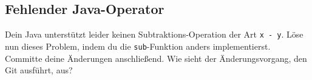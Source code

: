 \subsection{Fehlender Java-Operator}
Dein Java unterstützt leider keinen Subtraktions-Operation der Art \lstinline{x - y}. Löse nun dieses Problem, indem du die \lstinline{sub}-Funktion anders implementierst.\\
Committe deine Änderungen anschließend. Wie sieht der Änderungsvorgang, den Git ausführt, aus?
